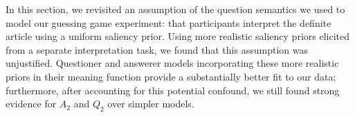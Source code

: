 \documentclass[12pt, floatsintext, jou]{apa6}
\begin{document}



In this section, we revisited an assumption of the question semantics we used to model our guessing game experiment: that participants interpret the definite article using a uniform saliency prior. Using more realistic saliency priors elicited from a separate interpretation task, we found that this assumption was unjustified. Questioner and answerer models incorporating these more realistic priors in their meaning function provide a substantially better fit to our data; furthermore, after accounting for this potential confound, we still found strong evidence for $A_2$ and $Q_2$ over simpler models.

\end{document}
